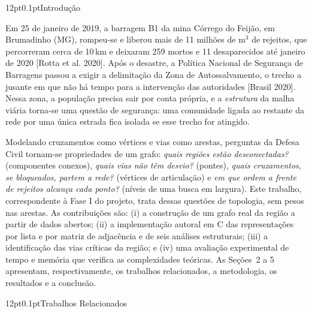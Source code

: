\documentclass[12pt,a4paper]{article}
\makeatletter
\renewcommand\section{\@startsection{section}{1}{\z@}%
  {12pt}{0.1pt}{\normalfont\fontsize{13}{15}\selectfont\bfseries}}
\makeatother
\begin{document}
\section{Introdução}

Em 25 de janeiro de 2019, a barragem B1 da mina Córrego do Feijão, em Brumadinho (MG), rompeu-se e liberou mais de 11 milhões de m$^3$ de rejeitos, que percorreram cerca de 10\,km e deixaram 259 mortos e 11 desaparecidos até janeiro de 2020 [Rotta et al. 2020]. Após o desastre, a Política Nacional de Segurança de Barragens passou a exigir a delimitação da Zona de Autossalvamento, o trecho a jusante em que não há tempo para a intervenção das autoridades [Brasil 2020]. Nessa zona, a população precisa sair por conta própria, e a \emph{estrutura} da malha viária torna-se uma questão de segurança: uma comunidade ligada ao restante da rede por uma única estrada fica isolada se esse trecho for atingido.

Modelando cruzamentos como vértices e vias como arestas, perguntas da Defesa Civil tornam-se propriedades de um grafo: \emph{quais regiões estão desconectadas?} (componentes conexos), \emph{quais vias não têm desvio?} (pontes), \emph{quais cruzamentos, se bloqueados, partem a rede?} (vértices de articulação) e \emph{em que ordem a frente de rejeitos alcança cada ponto?} (níveis de uma busca em largura). Este trabalho, correspondente à Fase I do projeto, trata dessas questões de topologia, sem pesos nas arestas. As contribuições são: (i) a construção de um grafo real da região a partir de dados abertos; (ii) a implementação autoral em C das representações por lista e por matriz de adjacência e de seis análises estruturais; (iii) a identificação das vias críticas da região; e (iv) uma avaliação experimental de tempo e memória que verifica as complexidades teóricas. As Seções~2 a 5 apresentam, respectivamente, os trabalhos relacionados, a metodologia, os resultados e a conclusão.

\section{Trabalhos Relacionados}
\end{document}
